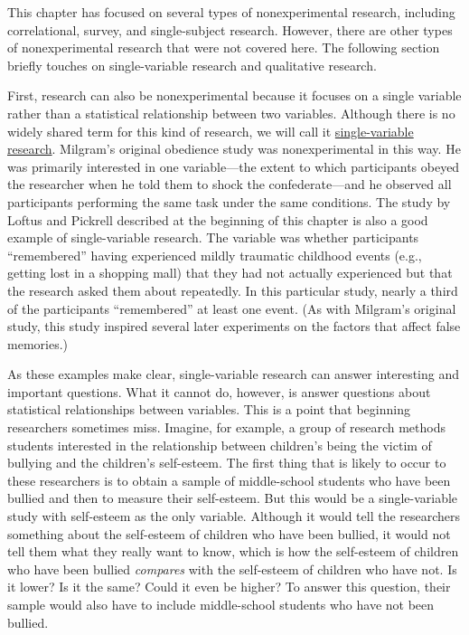 \documentclass[
]{krantz}
\begin{document}
This chapter has focused on several types of nonexperimental research, including correlational, survey, and single-subject research. However, there are other types of nonexperimental research that were not covered here. The following section briefly touches on single-variable research and qualitative research.

First, research can also be nonexperimental because it focuses on a single variable rather than a statistical relationship between two variables. Although there is no widely shared term for this kind of research, we will call it \hyperref[single-variable-research]{single-variable research}. Milgram's original obedience study was nonexperimental in this way. He was primarily interested in one variable---the extent to which participants obeyed the researcher when he told them to shock the confederate---and he observed all participants performing the same task under the same conditions. The study by Loftus and Pickrell described at the beginning of this chapter is also a good example of single-variable research. The variable was whether participants ``remembered'' having experienced mildly traumatic childhood events (e.g., getting lost in a shopping mall) that they had not actually experienced but that the research asked them about repeatedly. In this particular study, nearly a third of the participants ``remembered'' at least one event. (As with Milgram's original study, this study inspired several later experiments on the factors that affect false memories.)

As these examples make clear, single-variable research can answer interesting and important questions. What it cannot do, however, is answer questions about statistical relationships between variables. This is a point that beginning researchers sometimes miss. Imagine, for example, a group of research methods students interested in the relationship between children's being the victim of bullying and the children's self-esteem. The first thing that is likely to occur to these researchers is to obtain a sample of middle-school students who have been bullied and then to measure their self-esteem. But this would be a single-variable study with self-esteem as the only variable. Although it would tell the researchers something about the self-esteem of children who have been bullied, it would not tell them what they really want to know, which is how the self-esteem of children who have been bullied \emph{compares} with the self-esteem of children who have not. Is it lower? Is it the same? Could it even be higher? To answer this question, their sample would also have to include middle-school students who have not been bullied.
\end{document}
